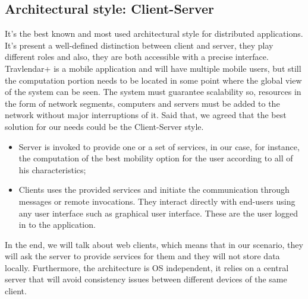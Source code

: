 \subsection{Architectural style: Client-Server}
It’s the best known and most used architectural style for distributed applications.
It’s present a well-defined distinction between client and server, they play different roles and also, they are both accessible with a precise interface.
Travlendar+ is a mobile application and will have multiple mobile users, but still the computation portion needs to be located in some point where the global view of the system can be seen.
The system must guarantee scalability so, resources in the form of network segments, computers and servers must be added to the network without major interruptions of it.
Said that, we agreed that the best solution for our needs could be the Client-Server style.
\begin{itemize}
\item	Server is invoked to provide one or a set of services, in our case, for instance, the computation of the best mobility option for the user according to all of his characteristics; 
\item	Clients uses the provided services and initiate the communication through messages or remote invocations. They interact directly with end-users using any user interface such as graphical user interface. These are the user logged in to the application.
\end{itemize}

In the end, we will talk about web clients, which means that in our scenario, they will ask the server to provide services for them and they will not store data locally. Furthermore, the architecture is OS independent, it relies on a central server that will avoid consistency issues between different devices of the same client.

